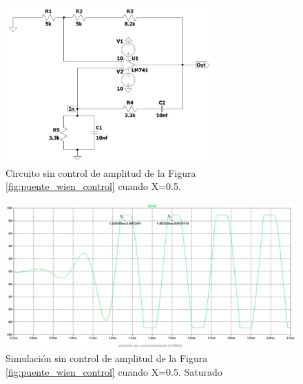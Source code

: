 \begin{enumerate}
\begin{itemize}
                    \begin{figure}[H]
                        \centering
                        \setcounter{figure}{6}
                        \includegraphics[width=8cm]{Imagenes/sim_cir_puente_wien_sc5.png}
                        \caption{Circuito sin control de amplitud de la Figura \ref{fig:puente_wien_control} cuando X=0.5.}
                        \label{fig:sim_cir_puente_wien_sc5}
                    \end{figure}

                    \begin{figure}[H]
                        \centering
                        \renewcommand{\figurename}{Gráfica}
                        \setcounter{figure}{2}
                        \includegraphics[width=15cm]{Imagenes/sim_puente_wien_sc5.png}
                        \caption{Simulación sin control de amplitud de la Figura \ref{fig:puente_wien_control} cuando X=0.5. Saturado}
                        \label{fig:sim_puente_wien_sc5}
                    \end{figure}


\end{itemize}
\end{enumerate}
